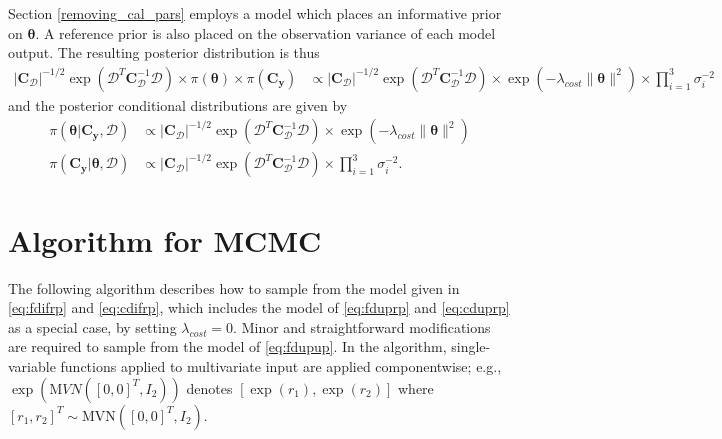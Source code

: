 \documentclass{article}
\begin{document}
\begin{appendices}
Section \ref{removing_cal_pars} employs a model which places an informative prior on $\boldsymbol \theta$. A reference prior is also placed on the observation variance of each model output. The resulting posterior distribution is thus
\begin{equation}\label{eq:fdifrp}
\begin{aligned}
\lvert \mathbf C_{\mathcal D} \rvert ^{-1/2} \exp (\mathcal D^T \mathbf C_{\mathcal D}^{-1}\mathcal D) \times \pi(\boldsymbol \theta) \times \pi(\mathbf C_{\mathbf y}) 
&\propto\lvert \mathbf C_{\mathcal D} \rvert ^{-1/2} \exp (\mathcal D^T \mathbf C_{\mathcal D}^{-1}\mathcal D) \times 
\exp(-\lambda_{cost} \lVert \boldsymbol\theta\rVert^2) \times
\prod_{i=1}^3 \sigma^{-2}_i
\end{aligned}
\end{equation}
and the posterior conditional distributions are given by
\begin{equation}\label{eq:cdifrp}
\begin{aligned}
\pi(\boldsymbol\theta|\mathbf C_{\mathbf y},\mathcal D) 
&\propto \lvert \mathbf C_{\mathcal D} \rvert ^{-1/2} \exp (\mathcal D^T \mathbf C_{\mathcal D}^{-1}\mathcal D) \times 
\exp(-\lambda_{cost} \lVert \boldsymbol\theta\rVert^2)\\
\pi(\mathbf C_{\mathbf y}| \boldsymbol \theta ,\mathcal D) &\propto
\lvert \mathbf C_{\mathcal D} \rvert ^{-1/2} \exp (\mathcal D^T \mathbf C_{\mathcal D}^{-1}\mathcal D) \times 
\prod_{i=1}^3 \sigma^{-2}_i.
\end{aligned}
\end{equation}

\section{Algorithm for MCMC}

The following algorithm describes how to sample from the model given in \eqref{eq:fdifrp} and \eqref{eq:cdifrp}, which includes the model of \eqref{eq:fduprp} and \eqref{eq:cduprp} as a special case, by setting $\lambda_{cost}=0$. 
Minor and straightforward modifications are required to sample from the model of \eqref{eq:fdupup}. In the algorithm, single-variable functions applied to multivariate input are applied componentwise; e.g., $\exp\left(\mathrm MVN([0, 0]^T,I_2)\right)$ denotes $[\exp(r_1), \exp(r_2)]$ where $[r_1, r_2]^T\sim\mathrm{MVN}([0, 0]^T,I_2)$.


\end{appendices}
\end{document}

